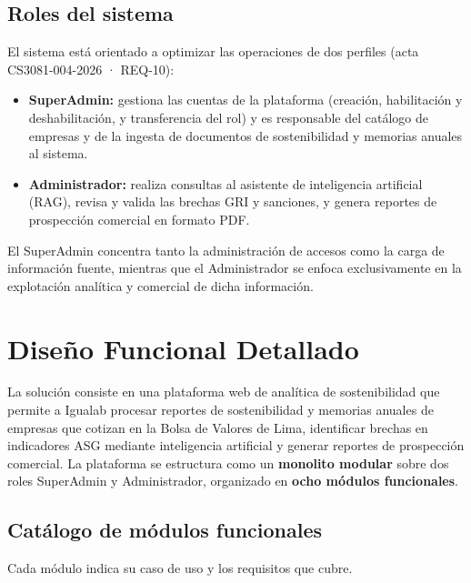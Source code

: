 \subsection{Roles del sistema}
El sistema está orientado a optimizar las operaciones de dos perfiles (acta CS3081-004-2026 · REQ-10):

\begin{itemize}[leftmargin=1.4em,itemsep=2pt,topsep=2pt]
  \item \textbf{SuperAdmin:} gestiona las cuentas de la plataforma (creación, habilitación y deshabilitación, y transferencia del rol) y es responsable del catálogo de empresas y de la ingesta de documentos de sostenibilidad y memorias anuales al sistema.
  \item \textbf{Administrador:} realiza consultas al asistente de inteligencia artificial (RAG), revisa y valida las brechas GRI y sanciones, y genera reportes de prospección comercial en formato PDF.
\end{itemize}

El SuperAdmin concentra tanto la administración de accesos como la carga de información fuente, mientras que el Administrador se enfoca exclusivamente en la explotación analítica y comercial de dicha información.

\section{Diseño Funcional Detallado}
La solución consiste en una plataforma web de analítica de sostenibilidad que permite a Igualab procesar reportes de sostenibilidad y memorias anuales de empresas que cotizan en la Bolsa de Valores de Lima, identificar brechas en indicadores ASG mediante inteligencia artificial y generar reportes de prospección comercial. La plataforma se estructura como un \textbf{monolito modular} sobre dos roles SuperAdmin y Administrador, organizado en \textbf{ocho módulos funcionales}.


\subsection{Catálogo de módulos funcionales}
Cada módulo indica su caso de uso y los requisitos que cubre.

